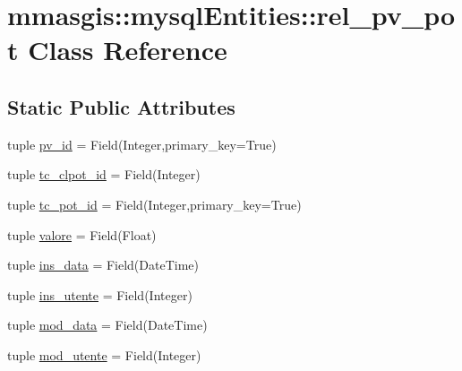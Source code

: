 \hypertarget{classmmasgis_1_1mysqlEntities_1_1rel__pv__pot}{
\section{mmasgis::mysqlEntities::rel\_\-pv\_\-pot Class Reference}
\label{classmmasgis_1_1mysqlEntities_1_1rel__pv__pot}
}
\subsection*{Static Public Attributes}
\begin{DoxyCompactItemize}
\item 
tuple \hyperlink{classmmasgis_1_1mysqlEntities_1_1rel__pv__pot_aab1b8a86ade1413faa73a2010e00dfbd}{pv\_\-id} = Field(Integer,primary\_\-key=True)
\item 
tuple \hyperlink{classmmasgis_1_1mysqlEntities_1_1rel__pv__pot_a7601091eb7ad449b14db2be4be7d1024}{tc\_\-clpot\_\-id} = Field(Integer)
\item 
tuple \hyperlink{classmmasgis_1_1mysqlEntities_1_1rel__pv__pot_a03b289fa596d71251aa6a80bc2d67690}{tc\_\-pot\_\-id} = Field(Integer,primary\_\-key=True)
\item 
tuple \hyperlink{classmmasgis_1_1mysqlEntities_1_1rel__pv__pot_a263160cf0ab8552271779721f166274b}{valore} = Field(Float)
\item 
tuple \hyperlink{classmmasgis_1_1mysqlEntities_1_1rel__pv__pot_af025c4016d6ac2732fa3bc13929b8286}{ins\_\-data} = Field(DateTime)
\item 
tuple \hyperlink{classmmasgis_1_1mysqlEntities_1_1rel__pv__pot_a769af9015dac1f9d84a4d7d57aae49b0}{ins\_\-utente} = Field(Integer)
\item 
tuple \hyperlink{classmmasgis_1_1mysqlEntities_1_1rel__pv__pot_a792cb5d5b004bce95168870dcb9fa46d}{mod\_\-data} = Field(DateTime)
\item 
tuple \hyperlink{classmmasgis_1_1mysqlEntities_1_1rel__pv__pot_ab178eb1e9cc50226848430eb34f8f57c}{mod\_\-utente} = Field(Integer)
\end{DoxyCompactItemize}


